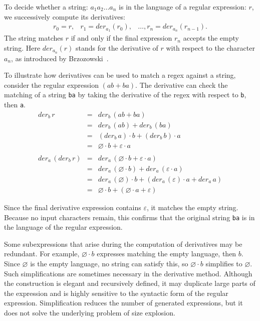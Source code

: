 \documentclass[12pt]{article}
\newcommand{\der}{\textit{der}}
\begin{document}
To decide whether a string: $a_1 a_2 \dots a_n$ is in the language of a regular expression: $r$, we successively 
compute its derivatives:
\[
\begin{array}{rcl}
r_0 = r,& r_1 = \der_{a_1}(r_0),& \dots, r_n = \der_{a_n}(r_{n-1}) .
\end{array}
\]
The string matches $r$ if and only if the final expression $r_n$ accepts the empty string. Here $\der_{a_n}(r)$ stands 
for the derivative of $r$ with respect to the character $a_n$, as introduced by Brzozowski~\cite{Brzozowski1964}.


To illustrate how derivatives can be used to match a regex against a string, consider the regular expression $( ab + ba )$. 
The derivative can check the matching of a string \texttt{ba} by taking the derivative of the regex with respect to \texttt{b},
then \texttt{a}.
\[
\begin{array}{rcl}
\der_b\, r           & =           &  \der_b\, (ab + ba) \\
                     & =           & \der_b\, (ab) + \der_b\, (ba) \\
                     & =           & (\der_b\, a) \cdot b + (\der_b\, b) \cdot a  \\
                     & =           & \varnothing \cdot b + \varepsilon \cdot a \\\\

\der_a\, (\der_b\, r) & =           & \der_a\, (\varnothing \cdot b + \varepsilon \cdot a)\\
                      & =           & \der_a\, (\varnothing \cdot b) + \der_a\, (\varepsilon \cdot a)\\
                      & =           & \der_a\,(\varnothing) \cdot b + (\der_a\, (\varepsilon) \cdot a + \der_a\, a)\\
                      & =           & \varnothing \cdot b + (\varnothing \cdot a + \varepsilon )
\end{array}
\]


Since the final derivative expression contains $\varepsilon$, it matches the empty string. Because no input characters 
remain, this confirms that the original string \texttt{ba} is in the language of the regular expression.


Some subexpressions that arise during the computation of derivatives may be redundant.  
For example, $\varnothing \cdot b$ expresses matching the empty language, then $b$.  
Since $\varnothing$ is the empty language, no string can satisfy this, so $\varnothing \cdot b$ simplifies to $\varnothing$.  
Such simplifications are sometimes necessary in the derivative method.  
Although the construction is elegant and recursively defined, it may duplicate large parts of the expression and is highly 
sensitive to the syntactic form of the regular expression. Simplification reduces the number of generated expressions, but 
it does not solve the underlying problem of size explosion.
\end{document}
